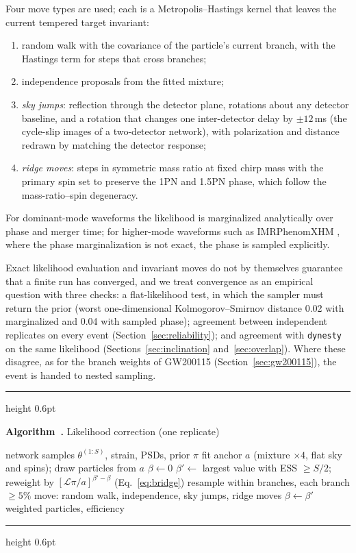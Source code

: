 \documentclass[twocolumn,linenumbers]{aastex701}
\newcounter{algocount}[section]
\renewcommand{\thealgocount}{\arabic{algocount}}
\newenvironment{algorithm}[1][t]{%
  \par\addvspace{1em}\refstepcounter{algocount}%
  \noindent\hrule height 0.6pt\par\smallskip\noindent
}{%
  \par\smallskip\noindent\hrule height 0.6pt\par\addvspace{1em}%
}
\newcommand{\algcaption}[1]{\textbf{Algorithm~\thealgocount.} #1\par\smallskip\noindent}
\begin{document}
Four move types are used; each is a Metropolis--Hastings kernel that leaves
the current tempered target invariant:
\begin{enumerate}
\item random walk with the covariance of the particle's current branch, with
  the Hastings term for steps that cross branches;
\item independence proposals from the fitted mixture;
\item \emph{sky jumps}: reflection through the detector plane, rotations about
  any detector baseline, and a rotation that changes one inter-detector delay
  by $\pm12$\,ms (the cycle-slip images of a two-detector network), with
  polarization and distance redrawn by matching the detector response;
\item \emph{ridge moves}: steps in symmetric mass ratio at fixed chirp mass with
  the primary spin set to preserve the 1PN and 1.5PN phase, which follow the
  mass-ratio--spin degeneracy.
\end{enumerate}

For dominant-mode waveforms the likelihood is marginalized analytically over
phase and merger time; for higher-mode waveforms such as IMRPhenomXHM
\citep{GarciaQuiros2020XHM}, where the phase marginalization is not exact, the
phase is sampled explicitly.

Exact likelihood evaluation and invariant moves do not by themselves guarantee
that a finite run has converged, and we treat convergence as an empirical
question with three checks: a flat-likelihood test, in which the sampler must
return the prior (worst one-dimensional Kolmogorov--Smirnov distance 0.02 with
marginalized and 0.04 with sampled phase); agreement between independent
replicates on every event (Section~\ref{sec:reliability}); and agreement with
\texttt{dynesty} on the same likelihood (Sections~\ref{sec:inclination}
and~\ref{sec:overlap}). Where these disagree, as for the branch weights of
GW200115 (Section~\ref{sec:gw200115}), the event is handed to nested
sampling.

\begin{algorithm}[t]
\algcaption{Likelihood correction (one replicate)}
\label{alg:smc}
\begin{algorithmic}[1]
\Require network samples $\theta^{(1:S)}$, strain, PSDs, prior $\pi$
\State fit anchor $a$ (mixture $\times4$, flat sky and spins); draw particles from $a$
\State $\beta \gets 0$
  \State $\beta' \gets$ largest value with ESS $\geq S/2$; reweight by $[\mathcal{L}\pi/a]^{\beta'-\beta}$ (Eq.~\ref{eq:bridge})
  \State resample within branches, each branch $\geq 5\%$
  \State move: random walk, independence, sky jumps, ridge moves
  \State $\beta \gets \beta'$
\EndWhile
\State \Return weighted particles, efficiency
\end{algorithmic}
\end{algorithm}
\end{document}
